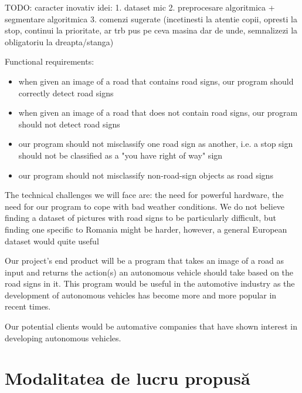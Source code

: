 \documentclass{article}
\begin{document}
TODO: caracter inovativ
idei:
1. dataset mic
2. preprocesare algoritmica + segmentare algoritmica
3. comenzi sugerate (incetinesti la atentie copii, opresti la stop, continui la prioritate, ar trb pus pe ceva masina dar de unde, semnalizezi la obligatoriu la dreapta/stanga)

Functional requirements:
\begin{itemize}
  \item when given an image of a road that contains road signs, our program should correctly detect road signs
  \item when given an image of a road that does not contain road signs, our program should not detect road signs
  \item our program should not misclassify one road sign as another, i.e. a stop sign should not be classified as
  a "you have right of way" sign
  \item our program should not misclassify non-road-sign objects as road signs
\end{itemize}

The technical challenges we will face are: the need for powerful hardware, the need for our program to cope
with bad weather conditions. We do not believe finding a dataset of pictures with road signs to be particularly
difficult, but finding one specific to Romania might be harder, however, a general European dataset would
quite useful


Our project's end product will be a program that takes an image of a road as input and returns the action(s) an
autonomous vehicle should take based on the road signs in it. This program would be useful in the automotive
industry as the development of autonomous vehicles has become more and more popular in recent times.

Our potential clients would be automative companies that have shown interest in developing autonomous vehicles.

\section{Modalitatea de lucru propusă}
\end{document}
